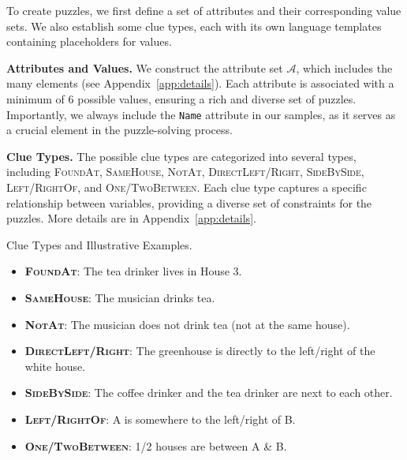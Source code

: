 To create puzzles, we first define a set of attributes and their corresponding value sets. We also establish some clue types, each with its own language templates containing placeholders for values. 


\textbf{Attributes and Values.} 
We construct the attribute set $\mathcal{A}$, which includes the many elements (see Appendix~\ref{app:details}). Each attribute is associated with a minimum of 6 possible values, ensuring a rich and diverse set of puzzles. Importantly, we always include the \texttt{Name} attribute in our samples, as it serves as a crucial element in the puzzle-solving process. 

\textbf{Clue Types.} 
The possible clue types are categorized into several types, including \textsc{FoundAt}, \textsc{SameHouse}, \textsc{NotAt}, \textsc{DirectLeft/Right}, \textsc{SideBySide}, \textsc{Left/RightOf}, and \textsc{One/TwoBetween}. Each clue type captures a specific relationship between variables, providing a diverse set of constraints for the puzzles. More details are in Appendix~\ref{app:details}.

\begin{AIbox}{Clue Types and Illustrative Examples.}
    \small
    \begin{itemize}[leftmargin=0em,itemsep=0pt]
        \item \textsc{\textbf{FoundAt}}: The tea drinker lives in House 3.
        \item \textsc{\textbf{SameHouse}}: The musician drinks tea.
        \item \textsc{\textbf{NotAt}}: The musician does not drink tea (not at the same house).
        \item \textsc{\textbf{DirectLeft/Right}}: The greenhouse is directly to the left/right of the white house.
        \item \textsc{\textbf{SideBySide}}: The coffee drinker and the tea drinker are next to each other.
        \item \textsc{\textbf{Left/RightOf}}: A is somewhere to the left/right of B.
        \item \textsc{\textbf{One/TwoBetween}}:  1/2 houses are between A \& B.
    \end{itemize}
\end{AIbox}

\newcommand{\algcomment}[1]{\hfill{\textcolor{commentcolor}{// #1}}}


